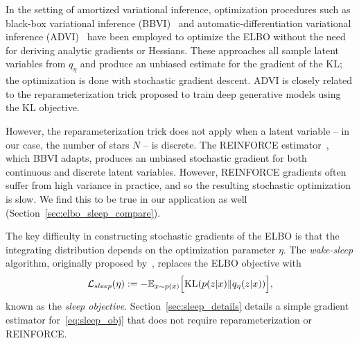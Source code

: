 
In the setting of amortized variational inference, 
optimization procedures such as black-box variational inference (BBVI)~\citep{ranganath2013black} and 
automatic-differentiation variational inference (ADVI)~\citep{kucukelbir2016automatic}
have been employed to optimize the ELBO without the need for 
deriving analytic gradients or Hessians. 
These approaches all sample latent variables from $q_\eta$ and produce an unbiased estimate 
for the gradient of the KL; the optimization is done with stochastic gradient descent. 
ADVI is closely related to the reparameterization trick \citep{kingma2013autoencoding, rezende2014stochastic} proposed to train deep generative models using the KL objective. 

However, the reparameterization trick does not apply when a latent variable -- in our case, the number of stars $N$ -- is discrete. The REINFORCE estimator~\citep{Williams1992reinforce}, which BBVI adapts, produces an unbiased stochastic gradient for both continuous and discrete latent variables.
However, REINFORCE gradients often suffer from high variance in practice, and so the resulting stochastic optimization is slow. We find this to be true in our application as well (Section~\ref{sec:elbo_sleep_compare}). 

The key difficulty in constructing stochastic gradients of the ELBO is that the integrating distribution depends on the optimization parameter $\eta$. 
The {\itshape wake-sleep} algorithm, originally proposed by~\cite{Hinton1995wake_sleep}, replaces the 
ELBO objective with 
\begin{align}
    \mathcal{L}_{sleep}(\eta) := 
    - \mathbb{E}_{x \sim p(x)}\Big[\textrm{KL}(p(z | x) \| q_\eta(z | x))\Big]
    \label{eq:sleep_obj},
\end{align}
known as the {\itshape sleep objective}.  Section~\ref{sec:sleep_details} details a simple gradient estimator for~\eqref{eq:sleep_obj} that does not require reparameterization or REINFORCE. 

